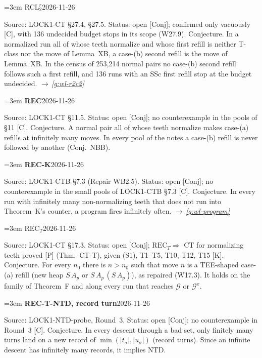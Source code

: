 \documentclass[11pt]{amsart}
\makeatletter
\newcommand{\sz}[1]{\lvert#1\rvert}
\newcommand{\Gc}{\mathcal G}
\newcounter{sense}
\newenvironment{entry}[3]{%
  \par\addvspace{\medskipamount}\noindent\phantomsection
  \def\@currentlabel{#2}\label{#1}\setcounter{sense}{0}\raggedright\emergencystretch=3em%
  \textbf{#2}\hfill{\footnotesize\textsf{#3}}\par\nopagebreak\noindent\ignorespaces}%
  {\par}
\newcommand{\src}[1]{\textsf{Source:} #1.\enskip}
\newcommand{\status}[1]{\textsf{Status:} #1.\enskip}
\renewcommand{\see}[1]{$\rightarrow$\,\emph{\ref{#1}}}
\makeatother
\begin{document}
\begin{entry}{g:wl-rcl2r}{$\mathrm{RCL}_2^{r}$}{2026-11-26}
\src{LOCK1-CT \S27.4, \S27.5}
\status{open [Conj]; confirmed only vacuously [C], with 136 undecided budget stops in its scope (W27.9)}
Conjecture. In a normalized run all of whose teeth normalize and whose first refill is neither T-class
nor the move of Lemma~XB, a case-(b) second refill is the move of Lemma~XB. In the census of 253,214
normal pairs no case-(b) second refill follows such a first refill, and 136 runs with an SSc first
refill stop at the budget undecided. \see{g:wl-r2c2}
\end{entry}

\begin{entry}{g:wl-rec}{REC}{2026-11-26}
\src{LOCK1-CT \S11.5}
\status{open [Conj]; no counterexample in the pools of \S11 [C]}
Conjecture. A normal pair all of whose teeth normalize makes case-(a) refills at infinitely many moves.
In every pool of the notes a case-(b) refill is never followed by another (Conj.~NBB).
\end{entry}

\begin{entry}{g:wl-rec-k}{REC-K}{2026-11-26}
\src{LOCK1-CTB \S7.3 (Repair WB2.5)}
\status{open [Conj]; no counterexample in the small pools of LOCK1-CTB \S7.3 [C]}
Conjecture. In every run with infinitely many non-normalizing teeth that does not run into Theorem~K's
counter, a program fires infinitely often. \see{g:wl-program}
\end{entry}

\begin{entry}{g:wl-rec-t}{$\mathrm{REC}_T$}{2026-11-26}
\src{LOCK1-CT \S17.3}
\status{open [Conj]; $\mathrm{REC}_T\Rightarrow$ CT for normalizing teeth proved [P] (Thm.~CT-T), given
(S1), T1--T5, T10, T12, T15 [K]}
Conjecture. For every $n_0$ there is $n>n_0$ such that move $n$ is a TEE-shaped case-(a) refill (new
heap $S\,A_p$ or $S\,A_p\,(S\,A_p)$), as repaired (W17.3). It holds on the family of Theorem~F and along
every run that reaches $\Gc$ or $\Gc^{x}$.
\end{entry}

\begin{entry}{g:wl-rec-t-ntd}{REC-T-NTD, record turn}{2026-11-26}
\src{LOCK1-NTD-probe, Round~3}
\status{open [Conj]; no counterexample in Round~3 [C]}
Conjecture. In every descent through a bad set, only finitely many turns land on a new record of
$\min(\sz{t_\sigma},\sz{u_\sigma})$ (record turns). Since an infinite descent has infinitely many
records, it implies NTD.
\end{entry}
\end{document}
